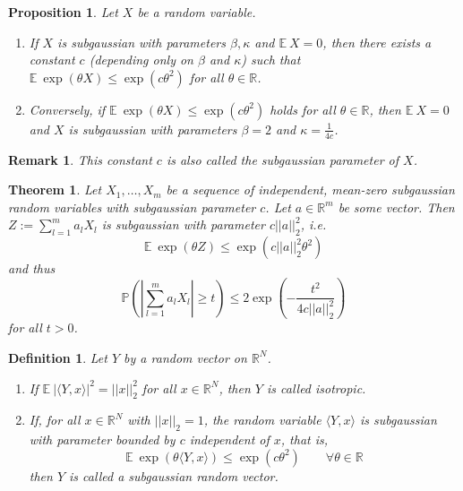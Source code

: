 \documentclass[10pt,a4paper]{article}
\theoremstyle{thmstyle}
\newtheorem{definition}{Definition}
\newtheorem{theorem}{Theorem}
\newtheorem{proposition}{Proposition}
\newtheorem{remark}{Remark}
\newcommand{\E}{\mathbb{E}~}
\renewcommand{\Pr}[1]{\mathbb{P}\left( #1 \right)}
\begin{document}
\begin{proposition}
  \label{proposition:subgaussian}
  Let $X$ be a random variable.
  \begin{enumerate}
  \item If $X$ is subgaussian with parameters $\beta, \kappa$ and $\E X = 0$, then there exists a constant $c$ (depending only on $\beta$ and $\kappa$) such that $\E \exp(\theta X) \le \exp(c \theta^{2})$ for all $\theta \in \mathbb{R}$.
  \item Conversely, if $\E \exp(\theta X) \le \exp(c \theta^{2})$ holds for all $\theta \in \mathbb{R}$, then $\E X = 0$ and $X$ is subgaussian with parameters $\beta = 2$ and $\kappa = \frac{1}{4c}$.
  \end{enumerate}
\end{proposition}

\begin{remark}
  This constant $c$ is also called the \emph{subgaussian parameter} of $X$.
\end{remark}

\begin{theorem}
  Let $X_{1}, \dots, X_{m}$ be a sequence of independent, mean-zero subgaussian random variables with subgaussian parameter $c$.
  Let $a \in \mathbb{R}^{m}$ be some vector.
  Then $Z := \sum_{l = 1}^{m} a_{l} X_{l}$ is subgaussian with parameter $c||a||_{2}^{2}$, i.e.
  \begin{equation*}
    \E \exp(\theta Z) \le \exp\left( c||a||_{2}^{2} \theta^{2} \right)
  \end{equation*}
  and thus
  \begin{equation*}
    \Pr{\left| \sum_{l = 1}^{m} a_{l} X_{l} \right| \ge t} \le 2 \exp\left( -\frac{t^{2}}{4c||a||_{2}^{2}} \right)
  \end{equation*}
  for all $t > 0$.
\end{theorem}

\begin{definition}
  Let $Y$ by a random vector on $\mathbb{R}^{N}$.
  \begin{enumerate}
  \item If $\E |\langle Y, x \rangle|^{2} = ||x||_{2}^{2}$ for all $x \in \mathbb{R}^{N}$, then $Y$ is called \emph{isotropic}.
  \item If, for all $x \in \mathbb{R}^{N}$ with $||x||_{2} = 1$, the random variable $\langle Y, x \rangle$ is subgaussian with parameter bounded by $c$ independent of $x$, that is,
    \begin{equation*}
      \E \exp(\theta \langle Y, x \rangle) \le \exp(c \theta^{2}) \qquad \forall \theta \in \mathbb{R}
    \end{equation*}
    then $Y$ is called a \emph{subgaussian random vector}.
  \end{enumerate}
\end{definition}
\end{document}
